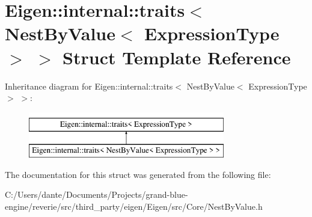 \hypertarget{struct_eigen_1_1internal_1_1traits_3_01_nest_by_value_3_01_expression_type_01_4_01_4}{}\section{Eigen\+::internal\+::traits$<$ Nest\+By\+Value$<$ Expression\+Type $>$ $>$ Struct Template Reference}
\label{struct_eigen_1_1internal_1_1traits_3_01_nest_by_value_3_01_expression_type_01_4_01_4}
Inheritance diagram for Eigen\+::internal\+::traits$<$ Nest\+By\+Value$<$ Expression\+Type $>$ $>$\+:\begin{figure}[H]
\begin{center}
\leavevmode
\includegraphics[height=2.000000cm]{struct_eigen_1_1internal_1_1traits_3_01_nest_by_value_3_01_expression_type_01_4_01_4}
\end{center}
\end{figure}


The documentation for this struct was generated from the following file\+:\begin{DoxyCompactItemize}
\item 
C\+:/\+Users/dante/\+Documents/\+Projects/grand-\/blue-\/engine/reverie/src/third\+\_\+party/eigen/\+Eigen/src/\+Core/Nest\+By\+Value.\+h\end{DoxyCompactItemize}
